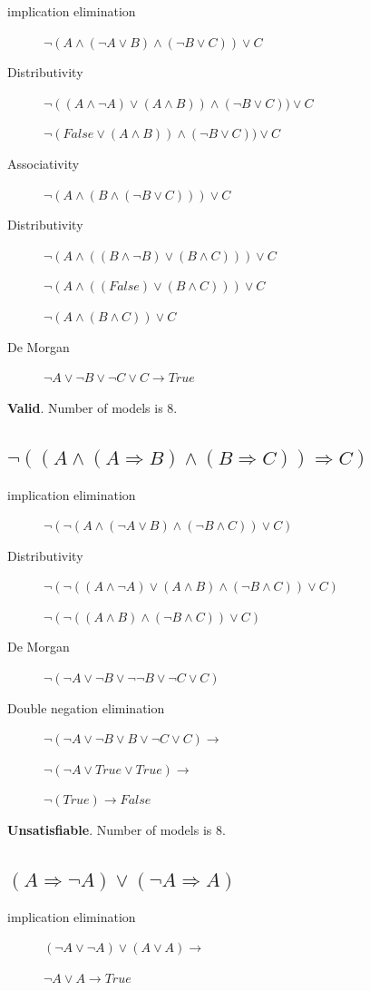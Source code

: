 \documentclass{article}                     %
\newcommand{\nt}[1]{\neg #1}
\begin{document}
	\begin{description}
		\item [implication elimination]
		$ \neg (A \land (\nt{A} \lor B) \land (\nt{B} \lor C)) \lor C  $
		\item [Distributivity]
		$ \neg ((A \land \nt{A}) \lor (A \land B)) \land (\nt{B} \lor C)) \lor C  $
		
		$ \neg (False \lor (A \land B)) \land (\nt{B} \lor C)) \lor C  $
		\item [Associativity]
		$ \neg (A \land (B \land (\nt{B} \lor C))) \lor C  $
		\item [Distributivity]
		$ \neg (A \land ((B \land \nt{B}) \lor (B \land C))) \lor C  $
		
		$ \neg (A \land ((False) \lor (B \land C))) \lor C  $

		$ \neg (A \land (B \land C)) \lor C  $
		\item[De Morgan]
		$ \nt{A} \lor \nt{B} \lor \nt{C} \lor C \rightarrow True $
	\end{description}

		\textbf{Valid}.  Number of models is 8.

	\subsection{$ \neg ((A \land (A \Rightarrow B) \land (B \Rightarrow C)) \Rightarrow C )$}
	\begin{description}
		\item[implication elimination] 	$ \neg (\neg(A \land (\nt{A} \lor B) \land (\nt{B} \land C)) \lor C )$
		\item[Distributivity]  $ \neg (\neg((A \land \nt{A}) \lor (A \land B) \land (\nt{B} \land C)) \lor C )$
		
		$ \neg (\neg((A \land B) \land (\nt{B} \land C)) \lor C )$
		\item[De Morgan] 		$ \neg (\nt{A} \lor \nt{B} \lor \nt{\nt{B}} \lor \nt{C} \lor C )$
		\item[Double negation elimination] $ \neg (\nt{A} \lor \nt{B} \lor B \lor \nt{C} \lor C ) \rightarrow $
		
		$ \neg (\nt{A} \lor True \lor True ) \rightarrow$
		
		$ \neg (True) \rightarrow False$
	\end{description}

	\textbf{Unsatisfiable}.  Number of models is 8.
	
	\subsection{$ (A\Rightarrow \nt{A}) \lor (\nt{A} \Rightarrow A) $}
		\begin{description}
		\item[implication elimination] $ (\nt{A} \lor \nt{A}) \lor (A \lor A) \rightarrow $
		
		$ \nt{A} \lor A \rightarrow True$
		
	\end{description}
\end{document}
